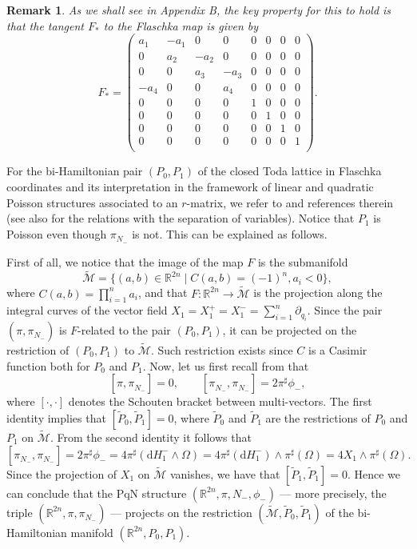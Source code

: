 \documentclass[12pt]{article}
\newtheorem{remark}[theorem]{Remark}
\newenvironment{rem}{\begin{remark} \rm}{\end{remark}}
\def\d{{\mathrm d}}
\newcommand{\RR}{{{\mathbb{R}}}}
\def\M{{\mathcal M}}
\begin{document}
\begin{rem}
As we shall see in Appendix B, the key property for this to hold is that the tangent $F_*$  to the Flaschka map is given by
\begin{equation}\label{Fstar4}
F_*=\left(
\begin{array}{cccc|cccc}
 a_1 & -a_1 & 0 & 0 & 0 & 0 & 0 & 0 \\
 0 & a_2 & -a_2 & 0 & 0 & 0 & 0 & 0 \\
 0 & 0 & a_3 & -a_3 & 0 & 0 & 0 & 0 \\
 -a_4 & 0 & 0 & a_4 & 0 & 0 & 0 & 0 \\
 \hline
 0 & 0 & 0 & 0 & 1 & 0 & 0 & 0 \\
 0 & 0 & 0 & 0 & 0 & 1 & 0 & 0 \\
 0 & 0 & 0 & 0 & 0 & 0 & 1 & 0 \\
 0 & 0 & 0 & 0 & 0 & 0 & 0 & 1 \\
\end{array}\right).
\end{equation}
\end{rem}
For the bi-Hamiltonian pair $(P_0,P_1)$ of the closed Toda lattice in Flaschka coordinates and its interpretation in the framework of linear and quadratic Poisson structures associated to an $r$-matrix, we refer to \cite{MorosiPizzocchero96} and references therein (see also \cite{FMP2001} for the relations with the separation of variables). Notice that $P_1$ is Poisson even though 
$\pi_{N_-}^{\phantom{\sharp}}$ is not. This can be explained as follows.

First of all, we notice that the image of the map $F$ is %
the submanifold 
$$
\widetilde\M=\{(a,b)\in \RR^{2n}\mid C(a,b)=(-1)^n, a_i<0\},
$$
where $C(a,b)=\prod_{i=1}^n a_i$, and that $F: \RR^{2n}\to\widetilde\M$ is the projection 
along the integral curves of the vector field $X_1=X^+_1=X^-_1=\sum_{i=1}^{n}\partial_{q_i}$. 
Since the pair $(\pi,\pi_{N_-}^{\phantom{\sharp}})$ is $F$-related to the pair $(P_0,P_1)$, it can be projected on the restriction of $(P_0,P_1)$ to $\widetilde\M$. 
Such restriction exists since $C$ is a Casimir function both for $P_0$ and $P_1$.
Now, let us first recall from \cite{SX} that  
$$
[\pi,\pi_{N_-}^{\phantom{\sharp}}]=0,\qquad [\pi_{N_-}^{\phantom{\sharp}},\pi_{N_-}^{\phantom{\sharp}}]=2\pi^\sharp\phi_-,
$$
where $[\cdot,\cdot]$ denotes the Schouten bracket between multi-vectors.
The first identity implies that $[\widetilde{P}_0,\widetilde{P}_1]=0$, where $\widetilde{P}_0$ and $\widetilde{P}_1$ are the restrictions of $P_0$ and $P_1$ on $\widetilde\M$. From the second identity it follows that 
$$
[\pi_{N_-}^{\phantom{\sharp}},\pi_{N_-}^{\phantom{\sharp}}]=2\pi^\sharp\phi_-=4\pi^\sharp(\d H_1^-\wedge\Omega)
=4\pi^\sharp(\d H_1^-)\wedge\pi^\sharp(\Omega)=4X_1\wedge\pi^\sharp(\Omega).
$$
Since the projection of $X_1$ on $\widetilde\M$ vanishes, we have that $[\widetilde{P}_1,\widetilde{P}_1]=0$.
Hence we can conclude that the PqN structure $(\RR^{2n},\pi,N_-,\phi_-)$ --- 
more precisely, the triple $(\RR^{2n},\pi,\pi_{N_-}^{\phantom{\sharp}})$ --- projects on the restriction 
$(\widetilde\M,\widetilde{P}_0,\widetilde{P}_1)$ of the bi-Hamiltonian manifold $(\RR^{2n},P_0,P_1)$.
\end{document}
